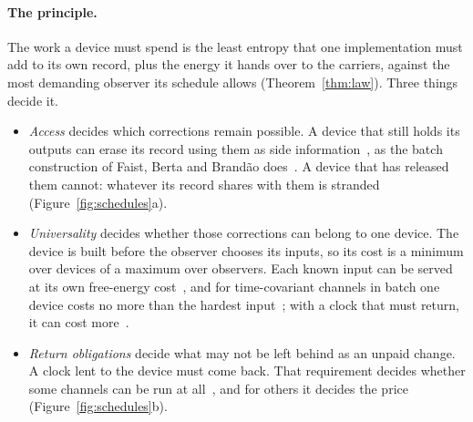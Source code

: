 \documentclass[11pt]{article}
\theoremstyle{definition}
\theoremstyle{remark}
\begin{document}
\paragraph{The principle.} The work a device must spend is the least entropy that one implementation must add to its own record, plus the energy it hands over to the carriers, against the most demanding observer its schedule allows (Theorem~\ref{thm:law}). Three things decide it.
\begin{itemize}[leftmargin=*]
\item \emph{Access} decides which corrections remain possible. A device that still holds its outputs can erase its record using them as side information~\cite{delRio11}, as the batch construction of Faist, Berta and Brand\~ao does~\cite[Sec.~7]{FBB21}. A device that has released them cannot: whatever its record shares with them is stranded (Figure~\ref{fig:schedules}a).
\item \emph{Universality} decides whether those corrections can belong to one device. The device is built before the observer chooses its inputs, so its cost is a minimum over devices of a maximum over observers. Each known input can be served at its own free-energy cost~\cite[Prop.~8.3]{FBB21}, and for time-covariant channels in batch one device costs no more than the hardest input~\cite{FBB19}; with a clock that must return, it can cost more~\cite{KeepingTime}.
\item \emph{Return obligations} decide what may not be left behind as an unpaid change. A clock lent to the device must come back. That requirement decides whether some channels can be run at all~\cite{MarvianSpekkens19,LostaglioMuller19}, and for others it decides the price (Figure~\ref{fig:schedules}b).
\end{itemize}
\end{document}

